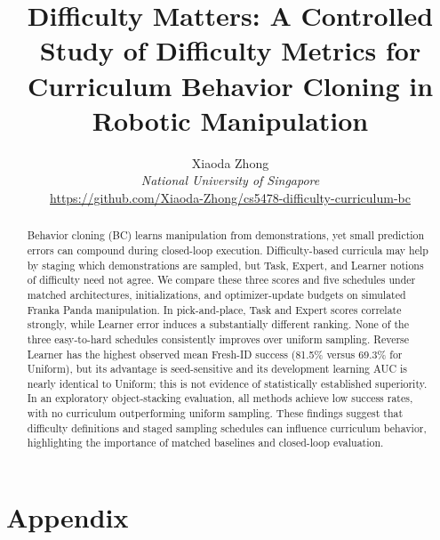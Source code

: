 \documentclass{article}
\title{Difficulty Matters: A Controlled Study of Difficulty Metrics for
Curriculum Behavior Cloning in Robotic Manipulation}
\author{Xiaoda Zhong\\
  \textit{National University of Singapore}\\
  \url{https://github.com/Xiaoda-Zhong/cs5478-difficulty-curriculum-bc}}
\begin{document}
\maketitle

\begin{abstract}
Behavior cloning (BC) learns manipulation from demonstrations, yet small
prediction errors can compound during closed-loop execution. Difficulty-based
curricula may help by staging which demonstrations are sampled, but Task,
Expert, and Learner notions of difficulty need not agree. We compare these
three scores and five schedules under matched
architectures, initializations, and optimizer-update budgets on simulated
Franka Panda manipulation. In pick-and-place, Task and Expert scores correlate
strongly, while Learner error induces a substantially different ranking. None
of the three easy-to-hard schedules consistently improves over uniform
sampling. Reverse Learner has the highest observed mean Fresh-ID success
(81.5\% versus 69.3\% for Uniform), but its advantage is seed-sensitive and
its development learning AUC is nearly identical to Uniform; this is not
evidence of statistically established superiority. In an exploratory
object-stacking evaluation, all methods achieve low success rates, with no
curriculum outperforming uniform sampling. These findings suggest that
difficulty definitions and staged sampling schedules can influence curriculum
behavior, highlighting the importance of matched baselines and closed-loop
evaluation.
\end{abstract}












\clearpage
\appendix
\section*{Appendix}
\suppressfloats[t]


\end{document}
